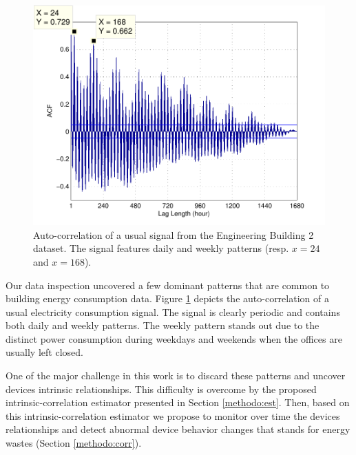 \begin{figure}[t!]
\includegraphics[width=.5\textwidth]{img/acf_101A1_GHP-eps-converted-to.pdf}
\caption{Auto-correlation of a usual signal from the Engineering Building 2 dataset.
The signal features daily and weekly patterns (resp. $x=24$ and $x=168$).}
\label{fig:autocorr}
\end{figure}

Our data inspection uncovered a few dominant patterns that are common to building energy consumption data.
Figure \ref{fig:autocorr} depicts the auto-correlation of a usual electricity consumption signal.
The signal is clearly periodic and contains both daily and weekly patterns.
The weekly pattern stands out due to the distinct power consumption during weekdays and weekends when the offices are usually left closed.

One of the major challenge in this work is to discard these patterns and uncover devices intrinsic relationships.
This difficulty is overcome by the proposed intrinsic-correlation estimator presented in Section \ref{methodo:est}.
Then, based on this intrinsic-correlation estimator we propose to monitor over time the devices relationships and detect abnormal device behavior changes that stands for energy wastes (Section \ref{methodo:corr}).

